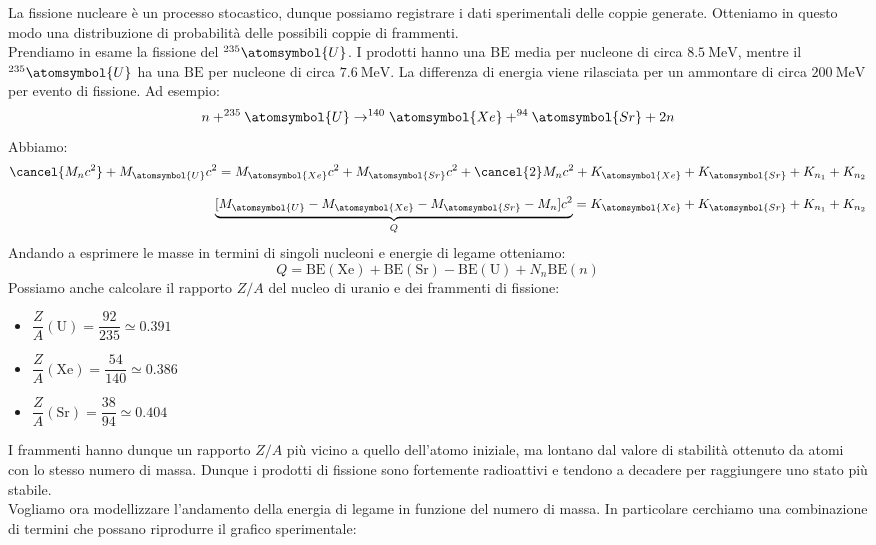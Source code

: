 La fissione nucleare è un processo stocastico, dunque possiamo registrare i dati sperimentali delle coppie generate. Otteniamo in questo modo una distribuzione di probabilità delle possibili coppie di frammenti.\\
Prendiamo in esame la fissione del $^{235}\atomsymbol{U}$. I prodotti hanno una $\text{BE}$ media per nucleone di circa $\qty{8.5}{\mega\electronvolt}$, mentre il $^{235}\atomsymbol{U}$ ha una $\text{BE}$ per nucleone di circa $\qty{7.6}{\mega\electronvolt}$. La differenza di energia viene rilasciata per un ammontare di circa $\qty{200}{\mega\electronvolt}$ per evento di fissione. Ad esempio:
\begin{equation}
 n + ^{235}\atomsymbol{U} \to ^{140}\atomsymbol{Xe} + ^{94}\atomsymbol{Sr} + 2n
\end{equation}
Abbiamo:
\begin{equation}
  \begin{split}
    \cancel{M_nc^2} + M_\atomsymbol{U} c^2 = M_{\atomsymbol{Xe}} c^2 + M_{\atomsymbol{Sr}} c^2 + \cancel{2}M_nc^2 + K_{\atomsymbol{Xe}} + K_{\atomsymbol{Sr}} + K_{n_1} + K_{n_2} \\[8pt]
    \underbrace{[M_\atomsymbol{U} - M_{\atomsymbol{Xe}} - M_{\atomsymbol{Sr}}- M_n]c^2}_{Q} = K_{\atomsymbol{Xe}} + K_{\atomsymbol{Sr}} + K_{n_1} + K_{n_2}
  \end{split}
\end{equation}
Andando a esprimere le masse in termini di singoli nucleoni e energie di legame otteniamo:
\begin{equation}
 Q = \text{BE}(\text{Xe}) + \text{BE}(\text{Sr}) - \text{BE}(\text{U}) + N_n \text{BE}(n)
\end{equation}
Possiamo anche calcolare il rapporto $Z/A$ del nucleo di uranio e dei frammenti di fissione:
\begin{itemize}
  \item $\dfrac{Z}{A} (\text{U}) = \dfrac{92}{235} \simeq 0.391 $
  \item $\dfrac{Z}{A}(\text{Xe}) = \dfrac{54}{140} \simeq 0.386 $
  \item $\dfrac{Z}{A}(\text{Sr}) = \dfrac{38}{94} \simeq 0.404$
\end{itemize}
I frammenti hanno dunque un rapporto $Z/A$ più vicino a quello dell'atomo iniziale, ma lontano dal valore di stabilità ottenuto da atomi con lo stesso numero di massa. Dunque i prodotti di fissione sono fortemente radioattivi e tendono a decadere per raggiungere uno stato più stabile.\\
Vogliamo ora modellizzare l'andamento della energia di legame in funzione del numero di massa. In particolare cerchiamo una combinazione di termini che possano riprodurre il grafico sperimentale:
